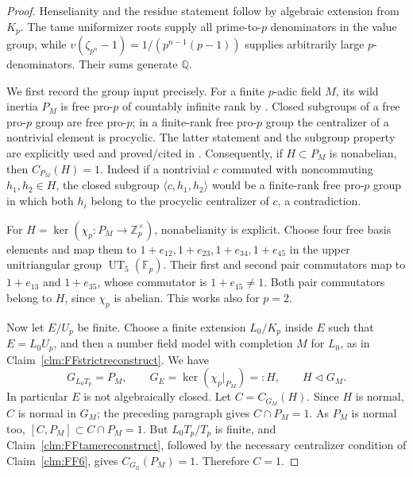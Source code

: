 \begin{proof}
Henselianity and the residue statement follow by
algebraic extension from \(K_p\). The tame
uniformizer roots supply all prime-to-\(p\)
denominators in the value group, while
\(v(\zeta_{p^n}-1)=1/(p^{n-1}(p-1))\)
supplies arbitrarily large \(p\)-denominators.
Their sums generate \(\mathbb Q\).

We first record the group input precisely.
For a finite \(p\)-adic field \(M\), its wild
inertia \(P_M\) is free pro-\(p\) of countably
infinite rank by
\citet[Theorem~2(ii), p.~463]{FF_Iwasawa1955}.
Closed subgroups of a free pro-\(p\) group are
free pro-\(p\); in a finite-rank free pro-\(p\)
group the centralizer of a nontrivial element
is procyclic. The latter statement and the
subgroup property are explicitly used and
proved/cited in
\citet[Theorem~5.1, proof, Case~I]{FF_KochloukovaZalesskii2011}.
Consequently, if \(H\subset P_M\) is nonabelian,
then \(C_{P_M}(H)=1\). Indeed if a nontrivial
\(c\) commuted with noncommuting
\(h_1,h_2\in H\), the closed subgroup
\(\langle c,h_1,h_2\rangle\) would be a
finite-rank free pro-\(p\) group in which both
\(h_i\) belong to the procyclic centralizer
of \(c\), a contradiction.

For
\(H=\ker(\chi_p:P_M\to\mathbb Z_p^\times)\),
nonabelianity is explicit. Choose four free
basis elements and map them to
\(1+e_{12},1+e_{23},1+e_{34},1+e_{45}\)
in the upper unitriangular group
\(\operatorname{UT}_5(\mathbb F_p)\).
Their first and second pair commutators map
to \(1+e_{13}\) and \(1+e_{35}\), whose
commutator is \(1+e_{15}\ne1\).
Both pair commutators belong to \(H\), since
\(\chi_p\) is abelian. This works also for
\(p=2\).

Now let \(E/U_p\) be finite. Choose a finite
extension \(L_0/K_p\) inside \(E\) such that
\(E=L_0U_p\), and then a number field model
with completion \(M\) for \(L_0\), as in
Claim~\ref{clm:FFstrictreconstruct}. We have
\[
 G_{L_0T_p}=P_M,
 \qquad G_E=\ker(\chi_p|_{P_M})=:H,
 \qquad H\triangleleft G_M.                            \tag{FF.31.3}
\]
In particular \(E\) is not algebraically closed.
Let \(C=C_{G_M}(H)\). Since \(H\) is normal,
\(C\) is normal in \(G_M\); the preceding
paragraph gives \(C\cap P_M=1\).
As \(P_M\) is normal too,
\([C,P_M]\subset C\cap P_M=1\).
But \(L_0T_p/T_p\) is finite, and
Claim~\ref{clm:FFtamereconstruct}, followed by
the necessary centralizer condition of
Claim~\ref{clm:FF6}, gives
\(C_{G_{\mathbb Q}}(P_M)=1\).
Therefore \(C=1\).


\end{proof}
